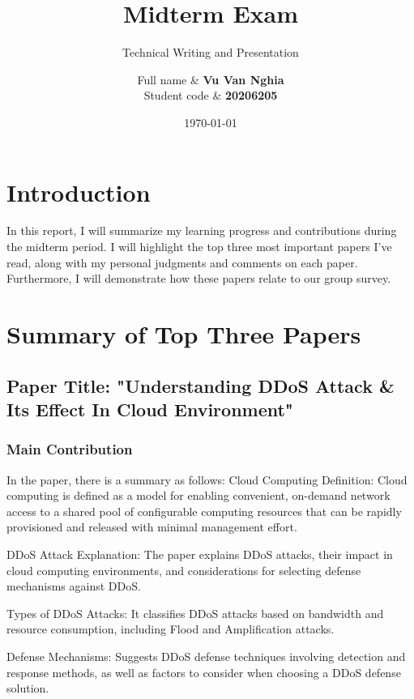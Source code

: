 \documentclass[12pt, twoside]{article}
\title{Midterm Exam}
\subtitle{Technical Writing and Presentation}
\author{
    Full name & \textbf{Vu Van Nghia} \\
    Student code &   \textbf{20206205} \\[1cm]
}
\date{\today}
\begin{document}
\maketitlepage
\tableofcontents
\newpage
\section{Introduction}
In this report, I will summarize my learning progress and contributions during the midterm period. I will highlight the top three most important papers I've read, along with my personal judgments and comments on each paper. Furthermore, I will demonstrate how these papers relate to our group survey.
\section{Summary of Top Three Papers}
\subsection{Paper Title: "Understanding DDoS Attack \& Its Effect In Cloud Environment" \cite{deshmukh2015understanding}}
\subsubsection{Main Contribution}
In the paper, there is a summary as follows:
Cloud Computing Definition: Cloud computing is defined as a model for enabling convenient, on-demand network access to a shared pool of configurable computing resources that can be rapidly provisioned and released with minimal management effort.

DDoS Attack Explanation: The paper explains DDoS attacks, their impact in cloud computing environments, and considerations for selecting defense mechanisms against DDoS.

Types of DDoS Attacks: It classifies DDoS attacks based on bandwidth and resource consumption, including Flood and Amplification attacks.

Defense Mechanisms: Suggests DDoS defense techniques involving detection and response methods, as well as factors to consider when choosing a DDoS defense solution.
\end{document}
